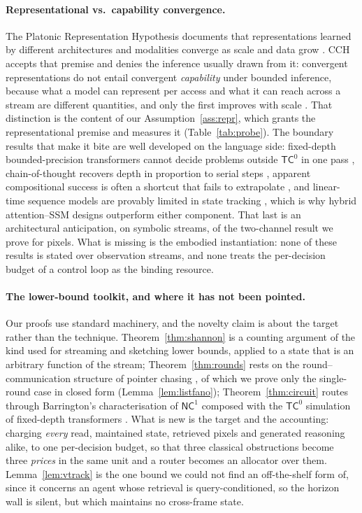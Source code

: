 \documentclass[10pt]{article}
\theoremstyle{definition}
\theoremstyle{plain}
\begin{document}
\paragraph{Representational vs.\ capability convergence.}
The Platonic Representation Hypothesis documents that representations learned by different
architectures and modalities converge as scale and data grow \citep{prh}. CCH accepts that
premise and denies the inference usually drawn from it: convergent representations do not entail
convergent \emph{capability} under bounded inference, because what a model can represent per
access and what it can reach across a stream are different quantities, and only the first
improves with scale \citep{cch}. That distinction is the content of our
Assumption~\ref{ass:repr}, which grants the representational premise and measures it
(Table~\ref{tab:probe}). The boundary results that make it bite are well developed on the
language side: fixed-depth bounded-precision transformers cannot decide problems outside
$\mathsf{TC}^0$ in one pass \citep{merrill-sat}, chain-of-thought recovers depth in proportion to
serial steps \citep{merrill-cot,feng-cot}, apparent compositional success is often a shortcut
that fails to extrapolate \citep{shortcuts}, and linear-time sequence models are provably
limited in state tracking \citep{illusion-state,mamba}, which is why hybrid attention--SSM
designs \citep{jamba,griffin} outperform either component. That last is an architectural
anticipation, on symbolic streams, of the two-channel result we prove for pixels. What is
missing is the embodied instantiation: none of these results is stated over observation streams,
and none treats the per-decision budget of a control loop as the binding resource.

\paragraph{The lower-bound toolkit, and where it has not been pointed.}
Our proofs use standard machinery, and the novelty claim is about the target rather than the
technique. Theorem~\ref{thm:shannon} is a counting argument of the kind used for streaming and
sketching lower bounds, applied to a state that is an arbitrary function of the stream;
Theorem~\ref{thm:rounds} rests on the round--communication structure of pointer chasing
\citep{pointerchasing,nisanwigderson}, of which we prove only the single-round case in closed
form (Lemma~\ref{lem:listfano}); Theorem~\ref{thm:circuit} routes through Barrington's
characterisation of $\mathsf{NC}^1$ \citep{barrington} composed with the $\mathsf{TC}^0$
simulation of fixed-depth transformers \citep{merrill-sat}. What is new is the target and the
accounting: charging \emph{every} read, maintained state, retrieved pixels and generated
reasoning alike, to one per-decision budget, so that three classical obstructions become three
\emph{prices} in the same unit and a router becomes an allocator over them.
Lemma~\ref{lem:vtrack} is the one bound we could not find an off-the-shelf form of, since it
concerns an agent whose retrieval is query-conditioned, so the horizon wall is silent, but which
maintains no cross-frame state.
\end{document}
